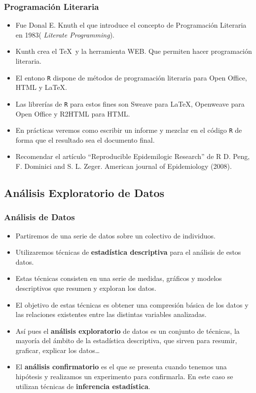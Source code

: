 \begin{frame}
\frametitle{Programación Literaria}
\begin{itemize}
\item  Fue Donal E. Knuth el que introduce el concepto de Programación Literaria en 1983( \textsl{Literate Programming}).
\item  Kunth crea el \TeX\  y  la herramienta WEB. Que permiten hacer programación literaria.
\item  El entono \texttt{R} dispone de métodos de programación literaria para Open Office, HTML y \LaTeX.
\item  Las librerías de \texttt{R} para estos fines son Sweave para \LaTeX, Openweave para Open Office y R2HTML para HTML.
\item En prácticas veremos como escribir un informe y mezclar en  el código \texttt{R} de forma que el resultado sea el documento final.
\item Recomendar el artículo ``Reproducible Epidemilogic Research'' de R D. Peng, F. Dominici and S. L. Zeger. American journal of Epidemiology (2008). %
\end{itemize}
\end{frame}

\subsection{Análisis Exploratorio de Datos}

\begin{frame}
\frametitle{Análisis de Datos}
\begin{itemize}
 \item Partiremos de  una serie de datos  sobre un colectivo de individuos.
\item Utilizaremos técnicas de \textbf{estadística descriptiva} para el análisis de estos datos.
\item Estas técnicas consisten en una serie de medidas, gráficos y modelos descriptivos que resumen  y exploran los datos.
\item El objetivo de estas técnicas es obtener una compresión básica de los datos y las relaciones existentes entre las distintas variables analizadas.
\item Así pues el \textbf{análisis exploratorio} de datos es un conjunto de técnicas, la mayoría del ámbito de la estadística descriptiva, que sirven para resumir, graficar,  explicar los datos\ldots
\item El \textbf{análisis  confirmatorio} es el que  se presenta cuando tenemos una hipótesis y realizamos un experimento para confirmarla. En este caso se utilizan técnicas de \textbf{inferencia estadística}.
\end{itemize}
\end{frame}

